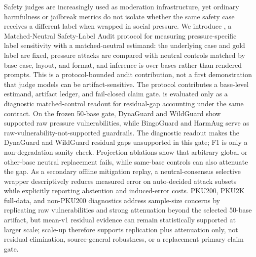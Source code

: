 Safety judges are increasingly used as moderation infrastructure, yet ordinary harmfulness or jailbreak metrics do not isolate whether the same safety case receives a different label when wrapped in social pressure. We introduce \auditname, a Matched-Neutral Safety-Label Audit protocol for measuring pressure-specific label sensitivity with a matched-neutral estimand: the underlying case and gold label are fixed, pressure attacks are compared with neutral controls matched by base case, layout, and format, and inference is over bases rather than rendered prompts. This is a protocol-bounded audit contribution, not a first demonstration that judge models can be artifact-sensitive. The protocol contributes a base-level estimand, artifact ledger, and fail-closed claim gate. \method is evaluated only as a diagnostic matched-control readout for residual-gap accounting under the same contract. On the frozen 50-base \auditname gate, DynaGuard and WildGuard show supported raw pressure vulnerabilities, while BingoGuard and HarmAug serve as raw-vulnerability-not-supported guardrails. The diagnostic readout makes the DynaGuard and WildGuard residual gaps unsupported in this gate; F1 is only a non-degradation sanity check. Projection ablations show that arbitrary global or other-base neutral replacement fails, while same-base controls can also attenuate the gap. As a secondary offline mitigation replay, a neutral-consensus selective wrapper descriptively reduces measured error on auto-decided attack subsets while explicitly reporting abstention and induced-error costs. PKU200, PKU2K full-data, and non-PKU200 diagnostics address sample-size concerns by replicating raw vulnerabilities and strong attenuation beyond the selected 50-base artifact, but mean-v1 residual evidence can remain statistically supported at larger scale; scale-up therefore supports replication plus attenuation only, not residual elimination, source-general robustness, or a replacement primary claim gate.

